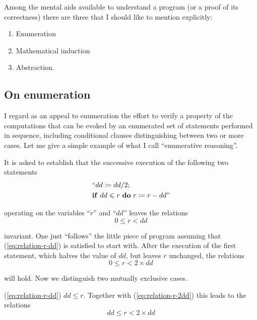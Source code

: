 Among the mental aids available to understand a program (or a proof of its correctness) there are three that I should like to mention explicitly:

\begin{enumerate}[wide, nosep, label=(\arabic*)]
\item Enumeration
\item Mathematical induction
\item Abstraction.
\end{enumerate}

\subsection{On enumeration}
\label{subsec:enumeration}

I regard as an appeal to enumeration the effort to verify a property of the computations that can be evoked by an enumerated set of statements performed in sequence, including conditional clauses distinguishing between two or more cases. Let me give a simple example of what I call ``enumerative reasoning''.

It is asked to establish that the successive execution of the following two statements
\begin{equation*}
	\begin{split}
		&\text{``}dd \coloneq dd/2; \\
		&\text{\textbf{if} } dd \leqslant r \text{ \textbf{do} } r \coloneq r - dd\text{''}
	\end{split}
\end{equation*}

\noindent
operating on the variables ``$r$'' and ``$dd$'' leaves the relations
\begin{equation}
	\label{eq:relation-r-dd}
	0 \leqslant r < dd
\end{equation}

\noindent
invariant. One just ``follows'' the little piece of program assuming that (\ref{eq:relation-r-dd}) is satisfied to start with. After the execution of the first statement, which halves the value of $dd$, but leaves $r$ unchanged, the relations
\begin{equation}
	\label{eq:relation-r-2dd}
	0 \leqslant r < 2\times dd
\end{equation}

\noindent
will hold. Now we distinguish two mutually exclusive cases.

(\ref{eq:relation-r-dd}) $dd \leqslant r$. Together with (\ref{eq:relation-r-2dd}) this leads to the relations
\begin{equation}
	\label{eq:relation-dd-r-2dd}
	dd \leqslant r < 2\times dd
\end{equation}

